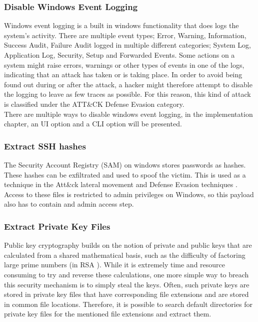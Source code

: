 \subsubsection{Disable Windows Event Logging}

Windows event logging is a built in windows functionality that does logs the system's activity. There are multiple event types; Error, Warning, Information, Success Audit, Failure Audit logged in multiple different categories; System Log, Application Log, Security, Setup and Forwarded Events. 
Some actions on a system might raise errors, warnings or other types of events in one of the logs, indicating that an attack has taken or is taking place. In order to avoid being found out during or after the attack, a hacker might therefore attempt to disable the logging to leave as few traces as possible. For this reason, this kind of attack is classified under the ATT\&CK Defense Evasion category. \\
There are multiple ways to disable windows event logging, in the implementation chapter, an UI option and a CLI option will be presented. 


\subsubsection{Extract SSH hashes}

The Security Account Registry (SAM) on windows stores passwords as hashes. These hashes can be exfiltrated and used to spoof the victim. This is used as a technique in the Att\&ck lateral movement and Defense Evasion techniques \cite{UseAlternateAuthentication}. \\
Access to these files is restricted to admin privileges on Windows, so this payload also has to contain and admin access step.

\subsubsection{Extract Private Key Files}

Public key cryptography builds on the notion of private and public keys that are calculated from a shared mathematical basis, such as the difficulty of factoring large prime numbers (in RSA \cite{rivestMethodObtainingDigital1978}). While it is extremely time and resource consuming to try and reverse these calculations, one more simple way to breach this security mechanism is to simply steal the keys. Often, such private keys are stored in private key files that have corresponding file extensions and are stored in common file locations. Therefore, it is possible to search default directories for private key files for the mentioned file extensions and extract them.    


